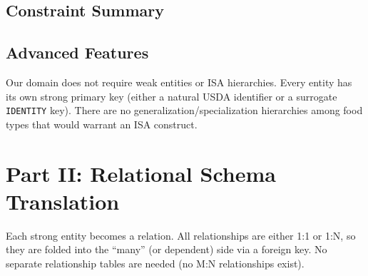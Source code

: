 \documentclass[12pt,a4paper]{article}
\begin{document}
\subsection{Constraint Summary}
\begin{table}[H]\centering\small
{}
\caption{Cardinality and participation constraints}
\end{table}

\subsection{Advanced Features}
Our domain does not require weak entities or ISA hierarchies. Every entity has its own strong primary key (either a natural USDA identifier or a surrogate \texttt{IDENTITY} key). There are no generalization/specialization hierarchies among food types that would warrant an ISA construct.

\section{Part II: Relational Schema Translation}

Each strong entity becomes a relation. All relationships are either 1:1 or 1:N, so they are folded into the ``many'' (or dependent) side via a foreign key. No separate relationship tables are needed (no M:N relationships exist).
\end{document}
